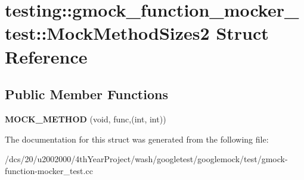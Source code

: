 \hypertarget{structtesting_1_1gmock__function__mocker__test_1_1MockMethodSizes2}{}\section{testing\+:\+:gmock\+\_\+function\+\_\+mocker\+\_\+test\+:\+:Mock\+Method\+Sizes2 Struct Reference}
\label{structtesting_1_1gmock__function__mocker__test_1_1MockMethodSizes2}
\subsection*{Public Member Functions}
\begin{DoxyCompactItemize}
\item 
\mbox{\label{structtesting_1_1gmock__function__mocker__test_1_1MockMethodSizes2_a6d32c0eaef58a3fa35d67a2fe903d93b}} 
{\bfseries M\+O\+C\+K\+\_\+\+M\+E\+T\+H\+OD} (void, func,(int, int))
\end{DoxyCompactItemize}


The documentation for this struct was generated from the following file\+:\begin{DoxyCompactItemize}
\item 
/dcs/20/u2002000/4th\+Year\+Project/wash/googletest/googlemock/test/gmock-\/function-\/mocker\+\_\+test.\+cc\end{DoxyCompactItemize}
